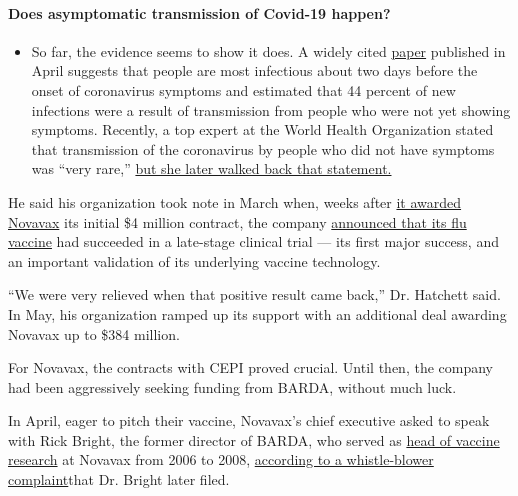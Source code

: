 \begin{itemize}
{  \paragraph{Does asymptomatic transmission of Covid-19
  happen?}\label{does-asymptomatic-transmission-of-covid-19-happen}}

  \begin{itemize}
  \tightlist
  \item
    So far, the evidence seems to show it does. A widely cited
    \href{https://www.nature.com/articles/s41591-020-0869-5}{paper}
    published in April suggests that people are most infectious about
    two days before the onset of coronavirus symptoms and estimated that
    44 percent of new infections were a result of transmission from
    people who were not yet showing symptoms. Recently, a top expert at
    the World Health Organization stated that transmission of the
    coronavirus by people who did not have symptoms was ``very rare,''
    \href{https://www.nytimes.com/2020/06/09/world/coronavirus-updates.html?action=click\&pgtype=Article\&state=default\&region=MAIN_CONTENT_3\&context=storylines_faq\#link-1f302e21}{but
    she later walked back that statement.}
  \end{itemize}
\end{itemize}

He said his organization took note in March when, weeks after
\href{https://ir.novavax.com/news-releases/news-release-details/novavax-awarded-funding-cepi-covid-19-vaccine-development}{it
awarded Novavax} its initial \$4 million contract, the company
\href{https://ir.novavax.com/news-releases/news-release-details/novavax-nanoflu-achieves-all-primary-endpoints-phase-3-clinical}{announced
that its flu vaccine} had succeeded in a late-stage clinical trial ---
its first major success, and an important validation of its underlying
vaccine technology.

``We were very relieved when that positive result came back,'' Dr.
Hatchett said. In May, his organization ramped up its support with an
additional deal awarding Novavax up to \$384 million.

For Novavax, the contracts with CEPI proved crucial. Until then, the
company had been aggressively seeking funding from BARDA, without much
luck.

In April, eager to pitch their vaccine, Novavax's chief executive asked
to speak with Rick Bright, the former director of BARDA, who served as
\href{https://ir.novavax.com/news-releases/news-release-details/novavax-appoints-new-vice-president-vaccine-research}{head
of vaccine research} at Novavax from 2006 to 2008,
\href{https://www.cnn.com/2020/05/05/politics/rick-bright-full-complaint/index.html}{according
to a whistle-blower complaint}that Dr. Bright later filed.

